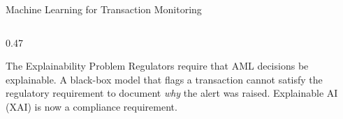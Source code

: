 \begin{frame}{Machine Learning for Transaction Monitoring}
\begin{columns}[T]
\begin{column}{0.47\textwidth}
      \begin{alertblock}{The Explainability Problem}
        Regulators require that AML decisions be \textcolor{mlred}{explainable}.
        A black-box model that flags a transaction cannot satisfy the
        regulatory requirement to document \textit{why} the alert was
        raised. Explainable AI (XAI) is now a compliance requirement.
      \end{alertblock}
    \end{column}
  \end{columns}
\end{frame}

